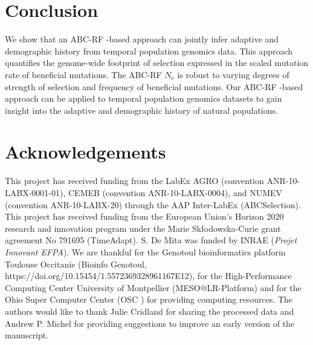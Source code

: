 \documentclass[a4paper, 12pt]{article}
\begin{document}
\section*{Conclusion}

We show that an ABC-RF -based approach can jointly infer adaptive and demographic history from temporal population genomics data. This approach quantifies the genome-wide footprint of selection expressed in the scaled mutation rate of beneficial mutations. The ABC-RF $N_{\mathrm{e}}$ is robust to varying degrees of strength of selection and frequency of beneficial mutations. Our ABC-RF -based approach can be applied to temporal population genomics datasets to gain insight into the adaptive and demographic history of natural populations.

\section*{Acknowledgements}

This project has received funding from the LabEx AGRO (convention ANR-10-LABX-0001-01), CEMEB (convention ANR-10-LABX-0004), and NUMEV (convention ANR-10-LABX-20) through the AAP Inter-LabEx (ABCSelection). This project has received funding from the European Union's Horizon 2020 research and innovation program under the Marie Skłodowska-Curie grant agreement No 791695 (TimeAdapt). S. De Mita was funded by INRAE (\textit{Projet Innovant EFPA}). We are thankful for the Genotoul bioinformatics platform Toulouse Occitanie (Bioinfo Genotoul, https://doi.org/10.15454/1.5572369328961167E12), for the High-Performance Computing Center University of Montpellier (MESO@LR-Platform) and for the Ohio Super Computer Center (OSC \citet{OhioSupercomputerCenter1987}) for providing computing resources. The authors would like to thank Julie Cridland for sharing the processed data and Andrew P. Michel for providing suggestions to improve an early version of the manuscript. 



\end{document}
